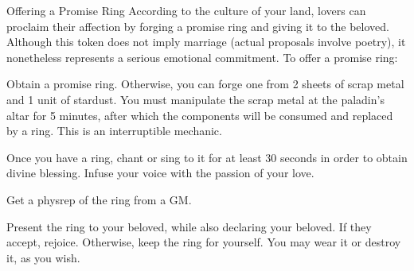 \documentclass[green]{guildcamp3}
\begin{document}
   \name{\gRing{}}
    Offering a Promise Ring
    According to the culture of your land, lovers can proclaim their affection by forging a promise ring and giving it to the beloved. Although this token does not imply marriage (actual proposals involve poetry), it nonetheless represents a serious emotional commitment.
    To offer a promise ring:
\begin{enum}[Directions]
      \item Obtain a promise ring. Otherwise, you can forge one from 2 sheets of scrap metal and 1 unit of stardust. You must manipulate the scrap metal at the paladin's altar for 5 minutes, after which the components will be consumed and replaced by a ring. This is an interruptible mechanic.
\item Once you have a ring, chant or sing to it for at least 30 seconds in order to obtain divine blessing. Infuse your voice with the passion of your love.
\item Get a physrep of the ring from a GM.
\item Present the ring to your beloved, while also declaring your beloved. If they accept, rejoice. Otherwise, keep the ring for yourself. You may wear it or destroy it, as you wish.
       \end{enum}
\end{document}
